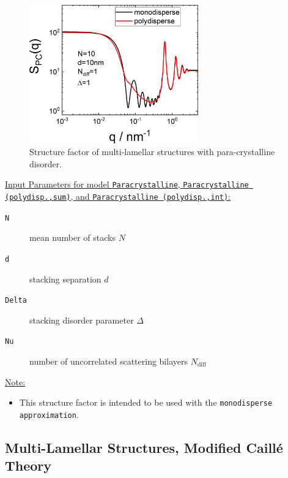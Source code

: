\begin{figure}[htb]
\begin{center}
\includegraphics[width=0.65\textwidth]{../images/structure_factor/Lamellar/PCLamellar.png}
\end{center}
\caption{Structure factor of multi-lamellar structures with para-crystalline disorder. }
\label{fig:PCLamellar}
\end{figure}

\vspace{5mm}

\noindent
\uline{Input Parameters for model \texttt{Paracrystalline}, \texttt{Paracrystalline (polydisp.,sum)}, and  \texttt{Paracrystalline (polydisp.,int)}:}
\begin{description}
\item[\texttt{N}] mean number of stacks $N$
\item[\texttt{d}] stacking separation $d$
\item[\texttt{Delta}]  stacking disorder parameter $\Delta$
\item[\texttt{Nu}]   number of uncorrelated scattering bilayers $N_\text{diff}$
\end{description}

\noindent\uline{Note:}
\begin{itemize}
\item This structure factor is intended to be used with the \texttt{monodisperse approximation}.
\end{itemize}


\subsection{Multi-Lamellar Structures, Modified Caill\'e Theory} ~\\

